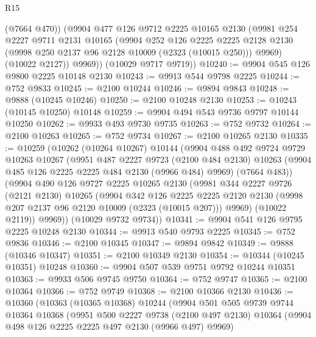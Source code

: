 \begin{lexlean}{R15}
\begin{coremodule}
          (@7664 @470))
        (@9904
          @477
          @126
          @9712
          @2225
          @10165
          @2130
          (@9981
            @254
            @2227
            @9711
            @2131
            @10165
            (@9904
              @252
              @126
              @2225
              @2225
              @2128
              @2130
              (@9998 @250 @2137 @96 @2128 @10009 (@2323 (@10015 @250)))
              @9969)
            (@10022 @2127))
          @9969))
      (@10029 @9717 @9719))
@10240 := @9904 @545 @126 @9800 @2225 @10148 @2130
@10243 := @9913 @544 @9798 @2225
@10244 := @752 @9833
@10245 := @2100 @10244
@10246 := @9894 @9843
@10248 := @9888 (@10245 @10246)
@10250 := @2100 @10248 @2130
@10253 := @10243 (@10145 @10250) @10148
@10259 := @9904 @494 @543 @9736 @9797 @10144 @10250
@10262 := @9933 @493 @9730 @9735
@10263 := @752 @9732
@10264 := @2100 @10263
@10265 := @752 @9734
@10267 := @2100 @10265 @2130
@10335 := @10259
    (@10262
      (@10264 @10267)
      @10144
      (@9904
        @488
        @492
        @9724
        @9729
        @10263
        @10267
        (@9951
          @487
          @2227
          @9723
          (@2100 @484 @2130)
          @10263
          (@9904 @485 @126 @2225 @2225 @484 @2130 (@9966 @484) @9969)
          (@7664 @483))
        (@9904
          @490
          @126
          @9727
          @2225
          @10265
          @2130
          (@9981
            @344
            @2227
            @9726
            (@2121 @2130)
            @10265
            (@9904
              @342
              @126
              @2225
              @2225
              @2120
              @2130
              (@9998 @207 @2137 @96 @2120 @10009 (@2323 (@10015 @207)))
              @9969)
            (@10022 @2119))
          @9969))
      (@10029 @9732 @9734))
@10341 := @9904 @541 @126 @9795 @2225 @10248 @2130
@10344 := @9913 @540 @9793 @2225
@10345 := @752 @9836
@10346 := @2100 @10345
@10347 := @9894 @9842
@10349 := @9888 (@10346 @10347)
@10351 := @2100 @10349 @2130
@10354 := @10344 (@10245 @10351) @10248
@10360 := @9904 @507 @539 @9751 @9792 @10244 @10351
@10363 := @9933 @506 @9745 @9750
@10364 := @752 @9747
@10365 := @2100 @10364
@10366 := @752 @9749
@10368 := @2100 @10366 @2130
@10436 := @10360
    (@10363
      (@10365 @10368)
      @10244
      (@9904
        @501
        @505
        @9739
        @9744
        @10364
        @10368
        (@9951
          @500
          @2227
          @9738
          (@2100 @497 @2130)
          @10364
          (@9904 @498 @126 @2225 @2225 @497 @2130 (@9966 @497) @9969)

\end{coremodule}
\end{lexlean}
